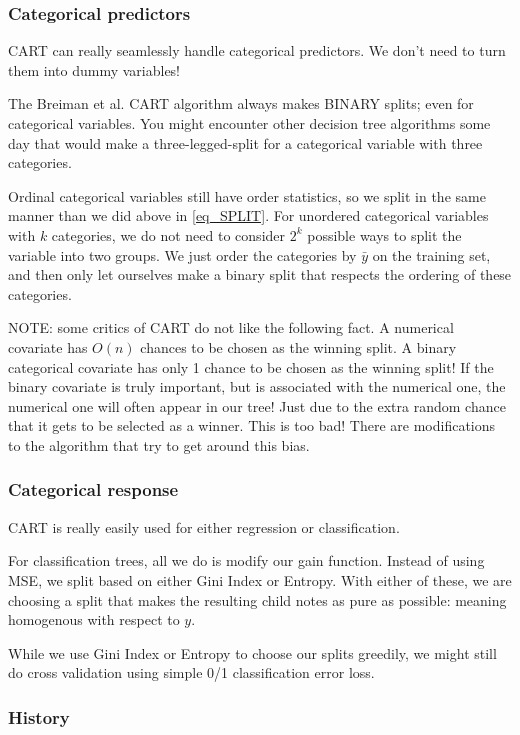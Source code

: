\subsubsection{Categorical predictors}

CART can really seamlessly handle categorical predictors. We don't need to turn them into dummy variables!

The Breiman et al. CART algorithm always makes BINARY splits; even for categorical variables. You might encounter other decision tree algorithms some day that would make a three-legged-split for a categorical variable with three categories.

Ordinal categorical variables still have order statistics, so we split in the same manner than we did above in \eqref{eq_SPLIT}. For unordered categorical variables with $k$ categories, we do not need to consider $2^k$ possible ways to split the variable into two groups. We just order the categories by $\bar{y}$ on the training set, and then only let ourselves make a binary split that respects the ordering of these categories. 


NOTE: some critics of CART do not like the following fact. A numerical covariate has $O(n)$ chances to be chosen as the winning split. A binary categorical covariate has only 1 chance to be chosen as the winning split! If the binary covariate is truly important, but is associated with the numerical one, the numerical one will often appear in our tree! Just due to the extra random chance that it gets to be selected as a winner. This is too bad! There are modifications to the algorithm that try to get around this bias. 

\subsubsection{Categorical response}

CART is really easily used for either regression or classification.

For classification trees, all we do is modify our gain function. Instead of using MSE,  we split based on either Gini Index or Entropy. With either of these, we are choosing a split that makes the resulting child notes as pure as possible: meaning homogenous with respect to $y$. 

While we use Gini Index or Entropy to choose our splits greedily, we might still do cross validation using simple 0/1 classification error loss. 

\subsubsection{History}

